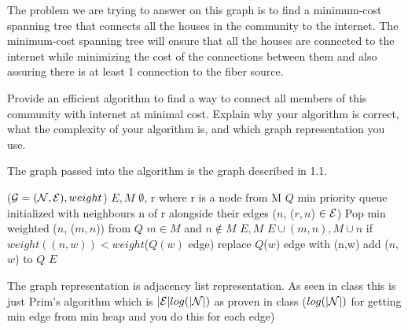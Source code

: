 \begin{problem}
\begin{questions}
The problem we are trying to answer on this graph is to find a minimum-cost spanning tree that connects all the houses in the community to the internet. The minimum-cost spanning tree will ensure that all the houses are connected to the internet while minimizing the cost of the connections between them and also assuring there is at least 1 connection to the fiber source.

\item Provide an efficient algorithm to find a way to connect all members of this community with internet at minimal cost. Explain why your algorithm is correct, what the complexity of your algorithm is, and which graph representation you use.

The graph passed into the algorithm is the graph described in 1.1.

\begin{myalgo}{($\mathcal{G} = (\mathcal{N}, \mathcal{E}), weight$)}
  \STATE $E, M$ \GETS $\emptyset$, r where r is a node from M
  \STATE $Q$ \GETS min priority queue initialized with neighbours n of r alongside their edges ($n$, ($r,n$) $\in \mathcal{E}$)
    \STATE Pop min weighted ($n$, ($m,n$)) from $Q$ $m \in M$ and $n \notin M$
    \STATE $E, M$ \GETS $E \cup {(m,n)}, M \cup {n}$
        \STATE if $weight((n,w)) < weight$($Q(w)$ edge) replace $Q$($w$) edge with (n,w)
      \ELSE
        \STATE add ($n$, $w$) to $Q$
      \ENDIF
    \ENDFOR
  \ENDWHILE
  \RETURN $E$
\end{myalgo}

The graph representation is adjacency list representation. As seen in class this is just Prim's algorithm which is $|\mathcal{E}| log(|\mathcal{N}|)$ as proven in class ($log(|\mathcal{N}|)$ for getting min edge from min heap and you do this for each edge)

\end{questions}
\end{problem}

